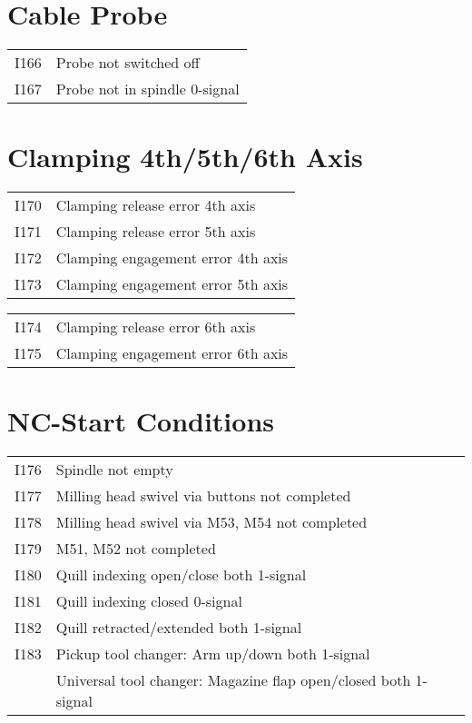 \documentclass[openany,11pt]{book}
\begin{document}
\section*{Cable Probe}

\begin{table}[!h]
    \begin{tabular}{ll}
    I166 & Probe not switched off \\
    I167 & Probe not in spindle 0-signal \\
    \end{tabular}
\end{table}

\section*{Clamping 4th/5th/6th Axis}

\begin{table}[!h]
    \begin{tabular}{ll}
    I170 & Clamping release error 4th axis \\
    I171 & Clamping release error 5th axis \\
    I172 & Clamping engagement error 4th axis \\
    I173 & Clamping engagement error 5th axis \\
    \end{tabular}
\end{table}

\newpage

\begin{table}[!h]
    \begin{tabular}{ll}
    I174 & Clamping release error 6th axis \\
    I175 & Clamping engagement error 6th axis \\
    \end{tabular}
\end{table}

\section*{NC-Start Conditions}

\begin{table}[!h]
    \begin{tabular}{ll}
    I176 & Spindle not empty \\
    I177 & Milling head swivel via buttons not completed \\
    I178 & Milling head swivel via M53, M54 not completed \\
    I179 & M51, M52 not completed \\
    I180 & Quill indexing open/close both 1-signal \\
    I181 & Quill indexing closed 0-signal \\
    I182 & Quill retracted/extended both 1-signal \\
    I183 & Pickup tool changer: Arm up/down both 1-signal \\
    & Universal tool changer: Magazine flap open/closed both 1-signal \\
    \end{tabular}
\end{table}
\end{document}

